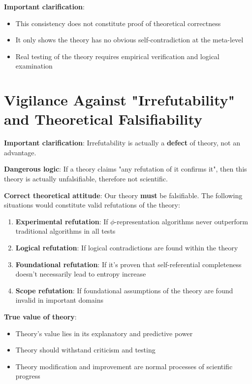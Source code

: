 \textbf{Important clarification}:
\begin{itemize}
\item This consistency does not constitute proof of theoretical correctness
\item It only shows the theory has no obvious self-contradiction at the meta-level
\item Real testing of the theory requires empirical verification and logical examination
\end{itemize}

\section{Vigilance Against "Irrefutability" and Theoretical Falsifiability}
\label{sec:ch07_defense:vigilance-against-irrefutability-and-theoretical-falsifiability}

\textbf{Important clarification}: Irrefutability is actually a \textbf{defect} of theory, not an advantage.

\textbf{Dangerous logic}:
If a theory claims "any refutation of it confirms it", then this theory is actually unfalsifiable, therefore not scientific.

\textbf{Correct theoretical attitude}:
Our theory \textbf{must} be falsifiable. The following situations would constitute valid refutations of the theory:

\begin{enumerate}
\item \textbf{Experimental refutation}: If $\phi$-representation algorithms never outperform traditional algorithms in all tests
\item \textbf{Logical refutation}: If logical contradictions are found within the theory
\item \textbf{Foundational refutation}: If it's proven that self-referential completeness doesn't necessarily lead to entropy increase
\item \textbf{Scope refutation}: If foundational assumptions of the theory are found invalid in important domains
\end{enumerate}

\textbf{True value of theory}:
\begin{itemize}
\item Theory's value lies in its explanatory and predictive power
\item Theory should withstand criticism and testing
\item Theory modification and improvement are normal processes of scientific progress
\end{itemize}

